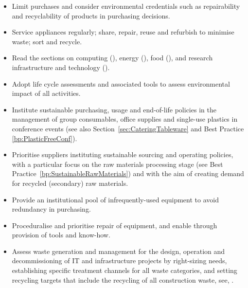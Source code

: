 \documentclass[../SustainableHEP.tex]{subfiles}
\begin{document}
\clearpage
\begin{reco2}{\currentname}
{
\begin{itemize}[leftmargin=3.5 mm]
\setlength{\itemsep}{\recskip}
\item Limit purchases and consider environmental credentials such as repairability and recyclability of products in purchasing decisions.

\item Service appliances regularly; share, repair, reuse and refurbish to minimise waste; sort and recycle.

\item Read the sections on computing (), energy (), food (), and research infrastructure and technology ().
\end{itemize}
}
{\begin{itemize}[leftmargin=3.5 mm]
\setlength{\itemsep}{\recskip}
\item Adopt life cycle assessments and associated tools to assess environmental impact of all activities.

\item Institute sustainable purchasing, usage and end-of-life policies in the management of group consumables,  office supplies and single-use plastics \eg in conference events (see also Section~\ref{sec:CateringTableware} and Best Practice \ref{bp:PlasticFreeConf}).
\end{itemize}
}
{
\begin{itemize}[leftmargin=3.5 mm]
\setlength{\itemsep}{\recskip}
\item Prioritise suppliers instituting sustainable sourcing and operating policies, with a particular focus on the raw materials processing stage (see Best Practice~\ref{bp:SustainableRawMaterials}) and with the aim of creating demand for recycled (secondary) raw materials.

\item Provide an institutional pool of infrequently-used equipment to avoid redundancy in purchasing.

\item Proceduralise and prioritise repair of equipment, and enable through provision of tools and know-how.

\item Assess waste generation and management for the design, operation and decommissioning of IT and infrastructure projects by right-sizing needs, establishing specific treatment channels for all waste categories, and setting recycling targets that include the recycling of all construction waste, see, \eg {}.

\end{itemize}
}
\end{reco2}
\end{document}
